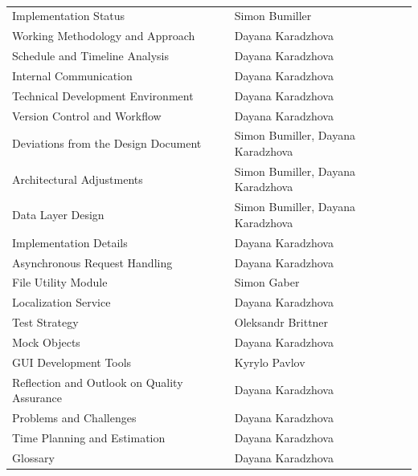 {}\\[5ex]

\begin{tabular}{p{9cm}p{7cm}}
Implementation Status & Simon Bumiller \\[0.4em]


Working Methodology and Approach & Dayana Karadzhova \\[0.4em]
Schedule and Timeline Analysis & Dayana Karadzhova \\[0.4em]
Internal Communication & Dayana Karadzhova \\[0.4em]
Technical Development Environment & Dayana Karadzhova \\[0.4em]
Version Control and Workflow & Dayana Karadzhova \\[0.4em]

Deviations from the Design Document & Simon Bumiller, Dayana Karadzhova \\[0.4em]
Architectural Adjustments & Simon Bumiller, Dayana Karadzhova \\[0.4em]
Data Layer Design & Simon Bumiller, Dayana Karadzhova \\[0.4em]
Implementation Details & Dayana Karadzhova \\[0.4em]
Asynchronous Request Handling & Dayana Karadzhova \\[0.4em]
File Utility Module & Simon Gaber \\[0.4em]
Localization Service & Dayana Karadzhova \\[0.4em]

Test Strategy & Oleksandr Brittner \\[0.4em]

Mock Objects & Dayana Karadzhova \\[0.4em]
GUI Development Tools & Kyrylo Pavlov \\[0.4em]

Reflection and Outlook on Quality Assurance & Dayana Karadzhova \\[0.4em]
Problems and Challenges & Dayana Karadzhova \\[0.4em]
Time Planning and Estimation & Dayana Karadzhova \\[0.4em]

Glossary & Dayana Karadzhova \\[0.4em]

\end{tabular}
